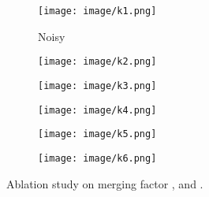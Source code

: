 \documentclass[letterpaper]{article} \usepackage{aaai20}  \usepackage{times}  \usepackage{helvet} \usepackage{courier}  \usepackage{comment}
\begin{document}
\begin{figure}[t]
	\centering
	\begin{subfigure}{0.15\linewidth} 
		\texttt{[image: image/k1.png]}
		\caption{Noisy} \end{subfigure}
	\begin{subfigure}{0.15\linewidth} 
		\texttt{[image: image/k2.png]}
		\caption{} \end{subfigure}
		\begin{subfigure}{0.15\linewidth} 
		\texttt{[image: image/k3.png]}
		\caption{} \end{subfigure}
	\begin{subfigure}{0.15\linewidth} 
		\texttt{[image: image/k4.png]}
		\caption{} \end{subfigure}
		\begin{subfigure}{0.15\linewidth} 
		\texttt{[image: image/k5.png]}
		\caption{} \end{subfigure}
		\begin{subfigure}{0.15\linewidth} 
		\texttt{[image: image/k6.png]}
		\caption{} \end{subfigure}
	\caption{Ablation study on merging factor , and .}
	\label{fig:k_ab}
\end{figure}
\end{document}
